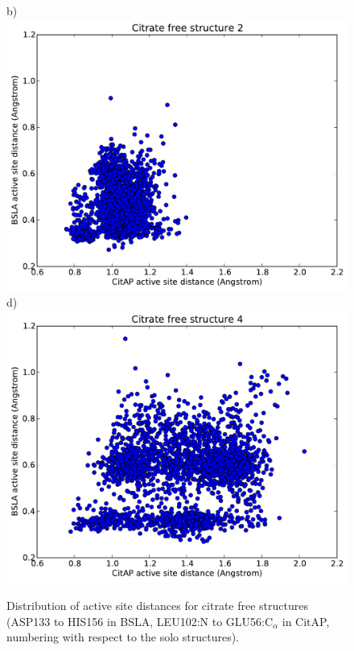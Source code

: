 \documentclass[english, a4paper, 12pt, titlepage, draft]{article}
\begin{document}
\begin{figure}
\begin{minipage}[]{0.45\linewidth}
        \centering
        b)
        \includegraphics[width=\textwidth]{figures/CitAP_BSLA_distance/BSLA_CitAP_distance_free_structure2.pdf}  
        d)
        \includegraphics[width=\textwidth]{figures/CitAP_BSLA_distance/BSLA_CitAP_distance_free_structure4.pdf}  
    \end{minipage}
    \caption{Distribution of active site distances for citrate free structures (ASP133 to HIS156 in BSLA, LEU102:N to GLU56:C$_{\alpha}$ in CitAP, numbering with respect to the solo structures).}
\label{fig:active_site_free_distribution}
\end{figure}       
\end{document}
